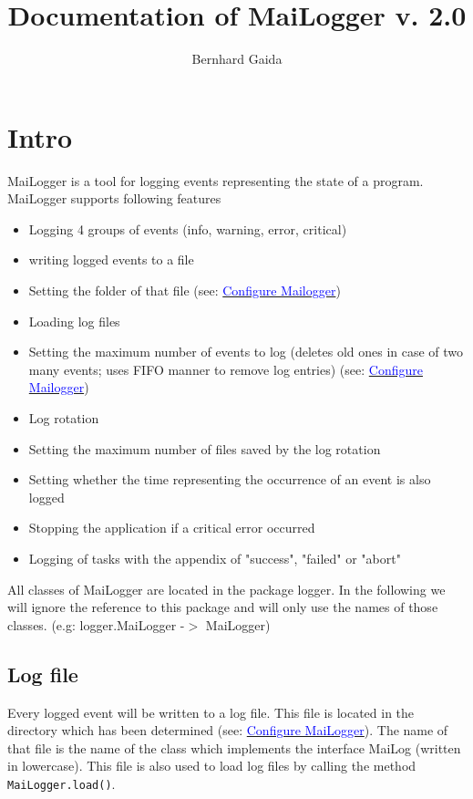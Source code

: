 \documentclass{article}
\title{Documentation of MaiLogger v. 2.0}
\author{Bernhard Gaida}
\newcommand{\refh}[2]{\hyperref[#1] {\textcolor{blue}{#2}}}
\newcommand{\coB}[1]{\textcolor{blue}{#1}}
\begin{document}
\maketitle
\tableofcontents
\pagebreak

\section{Intro}
\label{intro}
    MaiLogger is a tool for logging events representing the state of a program.
    MaiLogger supports following features
    \begin{itemize}
        \item Logging 4 groups of events (info, warning, error, critical)
        \item writing logged events to a file
        \item Setting the folder of that file (see: \hyperref[setup_mailogger.setup]{\coB{Configure Mailogger}})
        \item Loading log files
        \item Setting the maximum number of events to log (deletes old ones in case of two many events; uses FIFO manner to remove log entries) (see: \refh{setup_mailogger.setup}{Configure Mailogger})
        \item Log rotation
        \item Setting the maximum number of files saved by the log rotation
        \item Setting whether the time representing the occurrence of an event is also logged
        \item Stopping the application if a critical error occurred
        \item Logging of tasks with the appendix of "success", "failed" or "abort"
    \end{itemize}
    All classes of MaiLogger are located in the package logger.
    In the following we will ignore the reference to this package and will only use the names of those classes. (e.g: logger.MaiLogger -$>$ MaiLogger)

    \subsection{Log file}
    Every logged event will be written to a log file. This file is located in the directory which has been determined (see: \refh{setup_mailogger.setup}{Configure MaiLogger}).
    The name of that file is the name of the class which implements the interface MaiLog (written in lowercase).
    This file is also used to load log files by calling the method \lstinline|MaiLogger.load()|.
\end{document}
